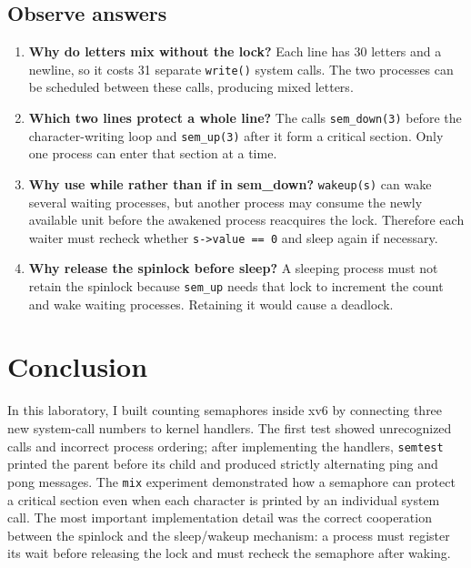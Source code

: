 \documentclass[12pt,a4paper]{article}
\begin{document}
\subsection{Observe answers}
\begin{enumerate}[label=\arabic*.]
\item \textbf{Why do letters mix without the lock?} Each line has 30 letters and a newline, so it costs 31 separate \texttt{write()} system calls. The two processes can be scheduled between these calls, producing mixed letters.
\item \textbf{Which two lines protect a whole line?} The calls \texttt{sem\_down(3)} before the character-writing loop and \texttt{sem\_up(3)} after it form a critical section. Only one process can enter that section at a time.
\item \textbf{Why use while rather than if in sem\_down?} \texttt{wakeup(s)} can wake several waiting processes, but another process may consume the newly available unit before the awakened process reacquires the lock. Therefore each waiter must recheck whether \texttt{s->value == 0} and sleep again if necessary.
\item \textbf{Why release the spinlock before sleep?} A sleeping process must not retain the spinlock because \texttt{sem\_up} needs that lock to increment the count and wake waiting processes. Retaining it would cause a deadlock.
\end{enumerate}

\section{Conclusion}
In this laboratory, I built counting semaphores inside xv6 by connecting three new system-call numbers to kernel handlers. The first test showed unrecognized calls and incorrect process ordering; after implementing the handlers, \texttt{semtest} printed the parent before its child and produced strictly alternating ping and pong messages. The \texttt{mix} experiment demonstrated how a semaphore can protect a critical section even when each character is printed by an individual system call. The most important implementation detail was the correct cooperation between the spinlock and the sleep/wakeup mechanism: a process must register its wait before releasing the lock and must recheck the semaphore after waking.
\end{document}

